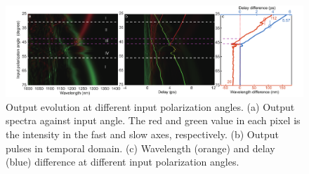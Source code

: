 \documentclass{osa-article}
\begin{document}
\begin{figure}[htbp]
\centering%
\includegraphics[width=\textwidth]{fig_sim.pdf}
\caption{Output evolution at different input polarization angles. (a) Output spectra against input angle. The red and green value in each pixel is the intensity in the fast and slow axes, respectively. (b) Output pulses in temporal domain. (c) Wavelength (orange) and delay (blue) difference at different input polarization angles.}
\label{fig_C}\vspace*{-6pt}
\end{figure}
\end{document}
